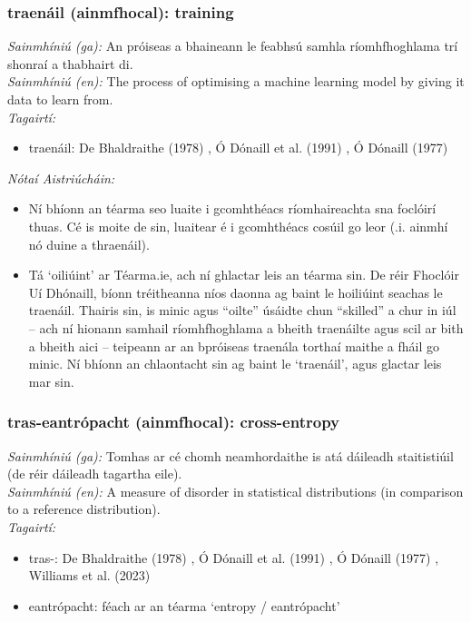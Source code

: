 \documentclass{article}
\begin{document}
\subsubsection*{traenáil (ainmfhocal): training}
 \noindent \textit{Sainmhíniú (ga):} An próiseas a bhaineann le feabhsú samhla ríomhfhoghlama trí shonraí a thabhairt di.
\\
 \noindent \textit{Sainmhíniú (en):} The process of optimising a machine learning model by giving it data to learn from.
\\
 \noindent \textit{Tagairtí:}
\begin{itemize}
	\item traenáil: De Bhaldraithe (1978) \cite{de-bhaldraithe}, Ó Dónaill et al. (1991) \cite{focloir-beag}, Ó Dónaill (1977) \cite{odonaill}
\end{itemize}

 \noindent \textit{Nótaí Aistriúcháin:}
\begin{itemize}
	\item Ní bhíonn an téarma seo luaite i gcomhthéacs ríomhaireachta sna foclóirí thuas. Cé is moite de sin, luaitear é i gcomhthéacs cosúil go leor (.i. ainmhí nó duine a thraenáil).
	\item Tá `oiliúint' ar Téarma.ie, ach ní ghlactar leis an téarma sin. De réir Fhoclóir Uí Dhónaill, bíonn tréitheanna níos daonna ag baint le hoiliúint seachas le traenáil. Thairis sin, is minic agus “oilte” úsáidte chun “skilled” a chur in iúl -- ach ní hionann samhail ríomhfhoghlama a bheith traenáilte agus scil ar bith a bheith aici -- teipeann ar an bpróiseas traenála torthaí maithe a fháil go minic. Ní bhíonn an chlaontacht sin ag baint le `traenáil', agus glactar leis mar sin.
\end{itemize}


\subsubsection*{tras-eantrópacht (ainmfhocal): cross-entropy}
 \noindent \textit{Sainmhíniú (ga):} Tomhas ar cé chomh neamhordaithe is atá dáileadh staitistiúil (de réir dáileadh tagartha eile).
\\
 \noindent \textit{Sainmhíniú (en):} A measure of disorder in statistical distributions (in comparison to a reference distribution).
\\
 \noindent \textit{Tagairtí:}
\begin{itemize}
	\item tras-: De Bhaldraithe (1978) \cite{de-bhaldraithe}, Ó Dónaill et al. (1991) \cite{focloir-beag}, Ó Dónaill (1977) \cite{odonaill}, Williams et al. (2023) \cite{storchiste}
	\item eantrópacht: féach ar an téarma `entropy / eantrópacht'
\end{itemize}
\end{document}
